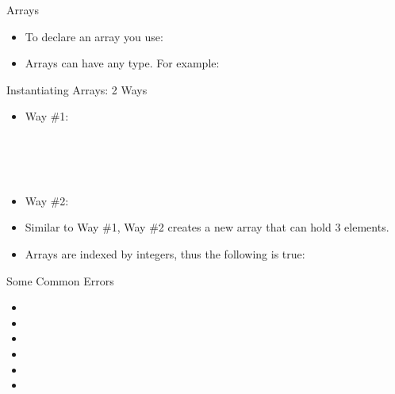 \begin{frame}{Arrays}
\begin{itemize}
\item To declare an array you use:
\begin{center}
\end{center}

\item Arrays can have any type. For example:
\begin{center}
\end{center}
\end{itemize}
\end{frame}


\begin{frame}{Instantiating Arrays: 2 Ways}
\begin{itemize}
\item Way \#1:
\begin{center}
\\
\\
\\
\end{center}\pause

\item Way \#2:
\begin{center}
\end{center}
\item Similar to Way \#1, Way \#2 creates a new array that can hold 3 elements.\pause
\item Arrays are indexed by integers, thus the following is true:
\begin{center}
\end{center}
\end{itemize}
\end{frame}

\begin{frame}{Some Common Errors}
\begin{itemize}
\item {} \pause
\item {} \pause
\item {} \pause
\item {} \pause
\item {} \pause
\item {}
\end{itemize}
\end{frame}

